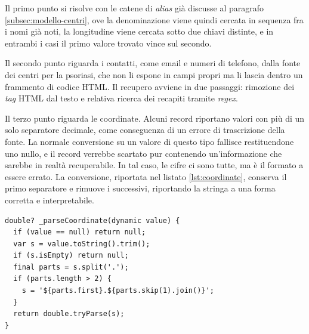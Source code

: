 Il primo punto si risolve con le catene di \textit{alias} già discusse al paragrafo \ref{subsec:modello-centri},
ove la denominazione viene quindi cercata in sequenza fra i nomi già noti, la longitudine viene cercata sotto
due chiavi distinte, e in entrambi i casi il primo valore trovato vince sul secondo.

Il secondo punto riguarda i contatti, come email e numeri di telefono, dalla fonte dei centri per la psoriasi,
che non li espone in campi propri ma li lascia dentro un frammento di codice HTML.
Il recupero avviene in due passaggi: rimozione dei \textit{tag} HTML dal testo e relativa ricerca dei recapiti tramite \textit{regex}.


Il terzo punto riguarda le coordinate.
Alcuni record riportano valori con più di un solo separatore decimale, come conseguenza di un errore di trascrizione della fonte.
La normale conversione su un valore di questo tipo fallisce restituendone uno nullo, e il record verrebbe scartato pur
contenendo un'informazione che sarebbe in realtà recuperabile.
In tal caso, le cifre ci sono tutte, ma è il formato a essere errato.
La conversione, riportata nel listato \ref{lst:coordinate}, conserva il primo separatore e rimuove i successivi,
riportando la stringa a una forma corretta e interpretabile.

\begin{listing}[H]
\begin{verbatim}
double? _parseCoordinate(dynamic value) {
  if (value == null) return null;
  var s = value.toString().trim();
  if (s.isEmpty) return null;
  final parts = s.split('.');
  if (parts.length > 2) {
    s = '${parts.first}.${parts.skip(1).join()}';
  }
  return double.tryParse(s);
}
\end{verbatim}
\caption{Conversione di una coordinata, con recupero dei valori che riportano più separatori decimali.}
\label{lst:coordinate}
\end{listing}

